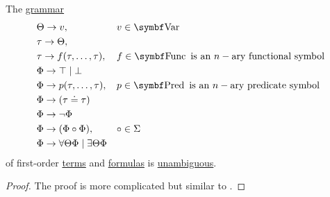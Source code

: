 \begin{proposition}\label{thm:first_order_formulas_are_unambiguous}
  The \hyperref[def:grammar]{grammar}
  \begin{equation*}
    \begin{aligned}
      &\Theta \to v,                                          && v \in \Bold{Var} \\
      &\tau \to \Theta,                                       && \\
      &\tau \to f(\tau, \ldots, \tau),                        && f \in \Cat{Func} \text{ is an } n-\text{ary functional symbol} \\
      &\Phi \to \top \;|\; \bot                               && \\
      &\Phi \to p(\tau, \ldots, \tau),                        && p \in \Cat{Pred} \text{ is an } n-\text{ary predicate symbol} \\
      &\Phi \to (\tau \doteq \tau)                            && \\
      &\Phi \to \neg \Phi                                     && \\
      &\Phi \to (\Phi \circ \Phi),                            && \circ \in \Sigma \\
      &\Phi \to \forall \Theta \Phi \;|\; \exists \Theta \Phi && \\
    \end{aligned}
  \end{equation*}
  of first-order \hyperref[def:first_order_term]{terms} and \hyperref[def:first_order_formula]{formulas} is \hyperref[def:ambiguous_grammar]{unambiguous}.
\end{proposition}
\begin{proof}
  The proof is more complicated but similar to .
\end{proof}

